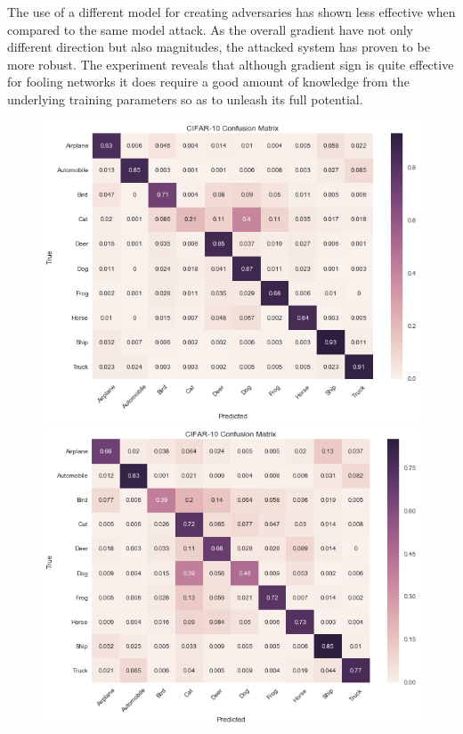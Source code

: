 \documentclass[runningheads,a4paper]{llncs}
\begin{document}
The use of a different model for creating adversaries has shown less effective when compared to the same model attack. As the overall gradient have not only different direction but also magnitudes, the attacked system has proven to be more robust. The experiment reveals that although gradient sign is quite effective for fooling networks it does require a good amount of knowledge from the underlying training parameters so as to unleash its full potential. 
\begin{figure}
	\label{fig7} 
	\begin{minipage}[b]{0.5\linewidth}
		\centering
		\includegraphics[width=1\linewidth]{cat_undersampling_per.png} 
	\end{minipage}%
	\begin{minipage}[b]{0.5\linewidth}
		\centering
		\includegraphics[width=1\linewidth]{cat_oversampling_per.png} 

\end{minipage}
\end{figure}
\end{document}
